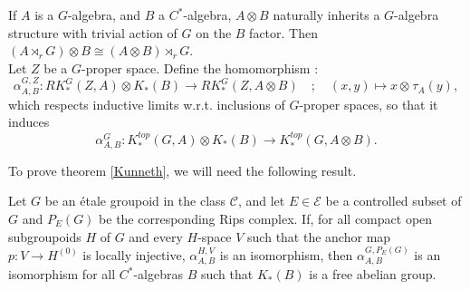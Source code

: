 If $A$ is a $G$-algebra, and $B$ a $C^*$-algebra, $A\otimes B$ naturally inherits a $G$-algebra structure with trivial action of $G$ on the $B$ factor. Then $(A\rtimes_r G)\otimes B \cong (A\otimes B)\rtimes_r G$.\\

Let $Z$ be a $G$-proper space. Define the homomorphism :
\[\alpha_{A,B}^{G,Z} : RK^G_*(Z,A)\otimes K_*(B)\rightarrow RK_*^G(Z,A\otimes B) \quad ; \quad (x,y)\mapsto x\otimes_{}   \tau_A(y),\]
which respects inductive limits w.r.t. inclusions of $G$-proper spaces, so that it induces
\[\alpha_{A,B}^G : K_*^{top}(G,A)\otimes K_*(B)\rightarrow K_*^{top}(G,A\otimes B ).\]

To prove theorem \ref{Kunneth}, we will need the following result.

\begin{thm}\label{TopologicalKunneth}
Let $G$ be an étale groupoid in the class $\mathcal C$, and let $E\in\mathcal E$ be a controlled subset of $G$ and $P_E(G)$ be the corresponding Rips complex. If, for all compact open subgroupoids $H$ of $G$ and every $H$-space $V$ such that the anchor map $p : V\rightarrow H^{(0)}$ is locally injective, $\alpha_{A,B}^{H,V}$ is an isomorphism, then $\alpha_{A,B}^{G,P_E(G)}$ is an isomorphism for all $C^*$-algebras $B$ such that $K_*(B)$ is a free abelian group.
\end{thm}


